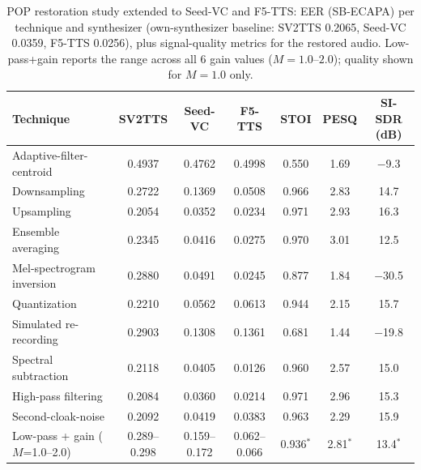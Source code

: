 \documentclass[11pt]{article}
\begin{document}
\begin{table}[H]
\centering
\caption{POP restoration study extended to Seed-VC and F5-TTS: EER
(SB-ECAPA) per technique and synthesizer (own-synthesizer baseline:
SV2TTS 0.2065, Seed-VC 0.0359, F5-TTS 0.0256), plus signal-quality
metrics for the restored audio. Low-pass+gain reports the range across
all 6 gain values ($M=1.0$--$2.0$); quality shown for $M=1.0$ only.}
\label{tab:restoration-pop-seedvc-f5tts}
\begin{tabular}{lcccccc}
\toprule
Technique & SV2TTS & Seed-VC & F5-TTS & STOI & PESQ & SI-SDR (dB) \\
\midrule
Adaptive-filter-centroid  & 0.4937 & 0.4762 & 0.4998 & 0.550 & 1.69 & $-$9.3 \\
Downsampling              & 0.2722 & 0.1369 & 0.0508 & 0.966 & 2.83 & 14.7 \\
Upsampling                & 0.2054 & 0.0352 & 0.0234 & 0.971 & 2.93 & 16.3 \\
Ensemble averaging        & 0.2345 & 0.0416 & 0.0275 & 0.970 & 3.01 & 12.5 \\
Mel-spectrogram inversion & 0.2880 & 0.0491 & 0.0245 & 0.877 & 1.84 & $-$30.5 \\
Quantization              & 0.2210 & 0.0562 & 0.0613 & 0.944 & 2.15 & 15.7 \\
Simulated re-recording    & 0.2903 & 0.1308 & 0.1361 & 0.681 & 1.44 & $-$19.8 \\
Spectral subtraction      & 0.2118 & 0.0405 & 0.0126 & 0.960 & 2.57 & 15.0 \\
High-pass filtering       & 0.2084 & 0.0360 & 0.0214 & 0.971 & 2.96 & 15.3 \\
Second-cloak-noise        & 0.2092 & 0.0419 & 0.0383 & 0.963 & 2.29 & 15.9 \\
Low-pass + gain ($M$=1.0--2.0) & 0.289--0.298 & 0.159--0.172 & 0.062--0.066 & 0.936$^{\ast}$ & 2.81$^{\ast}$ & 13.4$^{\ast}$ \\
\bottomrule
\end{tabular}
\end{table}
\end{document}
